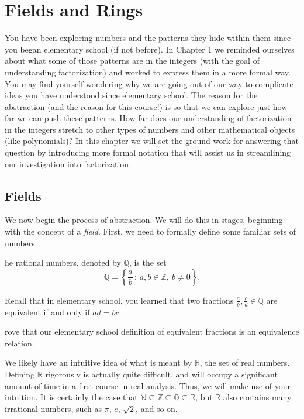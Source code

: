 \documentclass[english,course]{lecture}
\theoremstyle{plain}
\newenvironment{exercise}[1]
  {\renewcommand\theinnerexercise{#1}\innerexercise}
  {\endinnerexercise}
\newenvironment{definition}[1]
  {\renewcommand\theinnerdefinition{#1}\innerdefinition}
  {\endinnerdefinition}
\def\setof#1#2{{\left\{#1\,\colon\,#2\right\}}}
\def\Z{{\mathbb Z}}
\def\Q{{\mathbb Q}}
\def\N{{\mathbb N}}
\def\R{{\mathbb R}}
\begin{document}
\section{Fields and Rings}\label{Sec-Fields-and-Rings}
You have been exploring numbers and the patterns they hide within them since you began elementary school (if not before). In Chapter 1 we reminded ourselves about what some of those patterns are in the integers (with the goal of understanding factorization) and worked to express them in a more formal way. You may find yourself wondering why we are going out of our way to complicate ideas you have understood since elementary school. The reason for the abstraction (and the reason for this course!) is so that we can explore just how far we can push these patterns. How far does our understanding of factorization in the integers stretch to other types of numbers and other mathematical objects (like polynomials)? In this chapter we will set the ground work for answering that question by introducing more formal notation that will assist us in streamlining our investigation into factorization.


\subsection{Fields}\label{SubSec-Fields}

We now begin the process of abstraction.
We will do this in stages, beginning with the concept of a \emph{field}.
First, we need to formally define some familiar sets of numbers.


\begin{definition}
	The rational numbers, denoted by $\Q$, is the set
	\[
		\Q = \setof{\frac{a}{b}}{a,b\in \Z, \ b\ne 0}.
	\]
\end{definition}

Recall that in elementary school, you learned that two fractions $\frac{a}{b}, \frac{c}{d} \in \Q$ are equivalent if and only if $ad=bc$.

\begin{exercise}
    Prove that our elementary school definition of equivalent fractions is an equivalence relation.
\end{exercise}

We likely have an intuitive idea of what is meant by $\R$, the set of real numbers.
Defining $\R$ rigorously is actually quite difficult, and will occupy a significant amount of time in a first course in real analysis.
Thus, we will make use of your intuition. It is certainly the case that $\N\subseteq \Z\subseteq \Q\subseteq \R$, but $\R$ also contains many irrational numbers, such as $\pi$, $e$, $\sqrt{2}$, and so on.
\end{document}

